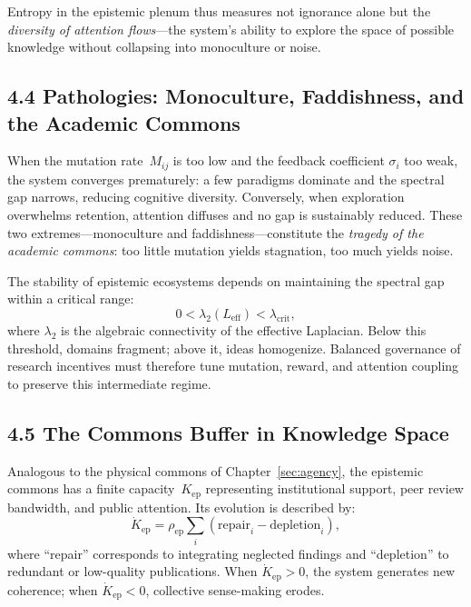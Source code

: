 \documentclass[11pt,a4paper,titlepage]{article}
\theoremstyle{definition}
\begin{document}
Entropy in the epistemic plenum thus measures not ignorance alone but the
\emph{diversity of attention flows}—the system’s ability to explore the space
of possible knowledge without collapsing into monoculture or noise.

\subsection{4.4 Pathologies: Monoculture, Faddishness, and the Academic Commons}

When the mutation rate~$M_{ij}$ is too low and the feedback coefficient
$\sigma_i$ too weak, the system converges prematurely: a few paradigms dominate
and the spectral gap narrows, reducing cognitive diversity.
Conversely, when exploration overwhelms retention, attention diffuses and no
gap is sustainably reduced.
These two extremes—monoculture and faddishness—constitute the
\emph{tragedy of the academic commons}:
too little mutation yields stagnation, too much yields noise.

The stability of epistemic ecosystems depends on maintaining the spectral gap
within a critical range:
\begin{equation}
0 < \lambda_2(L_{\text{eff}}) < \lambda_{\text{crit}},
\label{eq:spectral_condition}
\end{equation}
where $\lambda_2$ is the algebraic connectivity of the effective Laplacian.
Below this threshold, domains fragment; above it, ideas homogenize.
Balanced governance of research incentives must therefore tune mutation,
reward, and attention coupling to preserve this intermediate regime.

\subsection{4.5 The Commons Buffer in Knowledge Space}

Analogous to the physical commons of Chapter~\ref{sec:agency}, the epistemic
commons has a finite capacity~$K_{\text{ep}}$ representing institutional
support, peer review bandwidth, and public attention.
Its evolution is described by:
\begin{equation}
\dot{K}_{\text{ep}} = 
  \rho_{\text{ep}} \sum_i 
  (\text{repair}_i - \text{depletion}_i),
\label{eq:epistemic_commons}
\end{equation}
where “repair” corresponds to integrating neglected findings and “depletion”
to redundant or low-quality publications.  When $\dot{K}_{\text{ep}}>0$,
the system generates new coherence; when $\dot{K}_{\text{ep}}<0$,
collective sense-making erodes.
\end{document}
